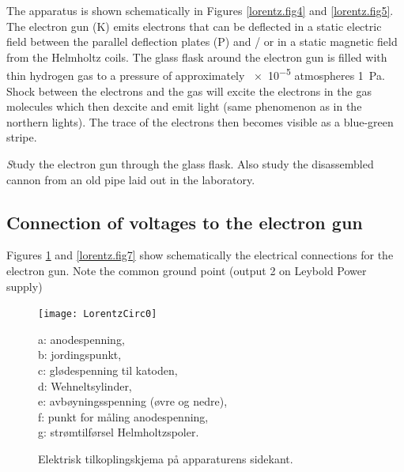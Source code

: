 \documentclass[../Elmag-labhefte-2020.tex]{subfiles}
\begin{document}
The apparatus is shown schematically in Figures \ref{lorentz.fig4} and \ref{lorentz.fig5}. The electron gun (\textsf{K}) emits electrons that can be deflected in a static electric field between the parallel deflection plates (\textsf{P}) and / or in a static magnetic field from the Helmholtz coils. The glass flask around the electron gun is filled with thin hydrogen gas to a pressure of approximately \num{e-5} atmospheres \SI{1}{\pascal}. Shock between the electrons and the gas will excite the electrons in the gas molecules which then dexcite and emit light (same phenomenon as in the northern lights). The trace of the electrons then becomes visible as a blue-green stripe.

{\emph Study the electron gun through the glass flask. Also study the disassembled cannon from an old pipe laid out in the laboratory.}
\newpage
\subsection{Connection of voltages to the electron gun}

Figures \ref{lorentz.fig6} and \ref{lorentz.fig7} show schematically the electrical connections for the electron gun. Note the common ground point (output 2 on Leybold Power supply)

\begin{figure}[!ht]
\RawFloats
    \vspace{-9em}
    \texttt{[image: LorentzCirc0]}
    \begin{minipage}[b]{0.42\textwidth}
        \textsf{%
            a: anodespenning,\\
            b: jordingspunkt,\\
            c: glødespenning til katoden,\\
            d: Wehneltsylinder,\\
            e: avbøyningsspenning (øvre og nedre),\\
            f: punkt for måling anodespenning,\\
            g: strømtilførsel Helmholtzspoler.
            \vspace{15mm}
        }
    \end{minipage}
    \caption{%
        Elektrisk tilkoplingskjema på apparaturens sidekant.
    }
    \label{lorentz.fig6}
\end{figure}
\end{document}
